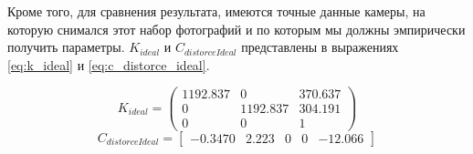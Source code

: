 	Кроме того, для сравнения результата, имеются точные данные камеры, на которую снимался этот набор фотографий и по которым мы должны эмпирически получить параметры. $K_{ideal}$ и $C_{distorceIdeal}$ представлены в выражениях \eqref{eq:k_ideal} и \eqref{eq:c_distorce_ideal}.
	
	\begin{equation}\label{eq:k_ideal}
		K_{ideal} = 
		\begin{pmatrix}
			1192.837 & 0 		& 370.637 \\
			0		 & 1192.837 & 304.191 \\ 
			0		 & 0		& 1 
		\end{pmatrix}
	\end{equation}
	\begin{equation}\label{eq:c_distorce_ideal}
		C_{distorceIdeal} = 
		\left[
			\begin{array}{ccccc}
				-0.3470 & 2.223 & 0 & 0 & -12.066
			\end{array}
		\right]
	\end{equation}
			